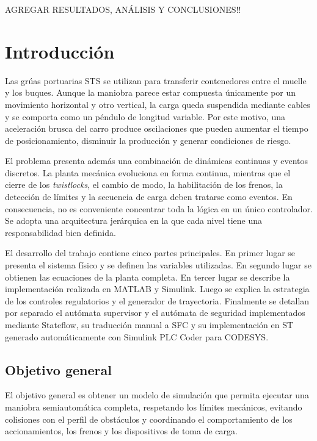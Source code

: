 \documentclass[a4paper,10pt,onecolumn,journal]{ieeeconf}
\numberwithin{equation}{section}
\begin{document}
AGREGAR RESULTADOS, ANÁLISIS Y CONCLUSIONES!!


\section{Introducción}
Las grúas portuarias STS se utilizan para transferir contenedores entre el muelle y los buques. Aunque la maniobra parece estar compuesta únicamente por un movimiento horizontal y otro vertical, la carga queda suspendida mediante cables y se comporta como un péndulo de longitud variable. Por este motivo, una aceleración brusca del carro produce oscilaciones que pueden aumentar el tiempo de posicionamiento, disminuir la producción y generar condiciones de riesgo.

El problema presenta además una combinación de dinámicas continuas y eventos discretos. La planta mecánica evoluciona en forma continua, mientras que el cierre de los \textit{twistlocks}, el cambio de modo, la habilitación de los frenos, la detección de límites y la secuencia de carga deben tratarse como eventos. En consecuencia, no es conveniente concentrar toda la lógica en un único controlador. Se adopta una arquitectura jerárquica en la que cada nivel tiene una responsabilidad bien definida.

El desarrollo del trabajo contiene cinco partes principales. En primer lugar se presenta el sistema físico y se definen las variables utilizadas. En segundo lugar se obtienen las ecuaciones de la planta completa. En tercer lugar se describe la implementación realizada en MATLAB y Simulink. Luego se explica la estrategia de los controles regulatorios y el generador de trayectoria. Finalmente se detallan por separado el autómata supervisor y el autómata de seguridad implementados mediante Stateflow, su traducción manual a SFC y su implementación en ST generado automáticamente con Simulink PLC Coder para CODESYS.

\subsection{Objetivo general}
El objetivo general es obtener un modelo de simulación que permita ejecutar una maniobra semiautomática completa, respetando los límites mecánicos, evitando colisiones con el perfil de obstáculos y coordinando el comportamiento de los accionamientos, los frenos y los dispositivos de toma de carga.
\end{document}
